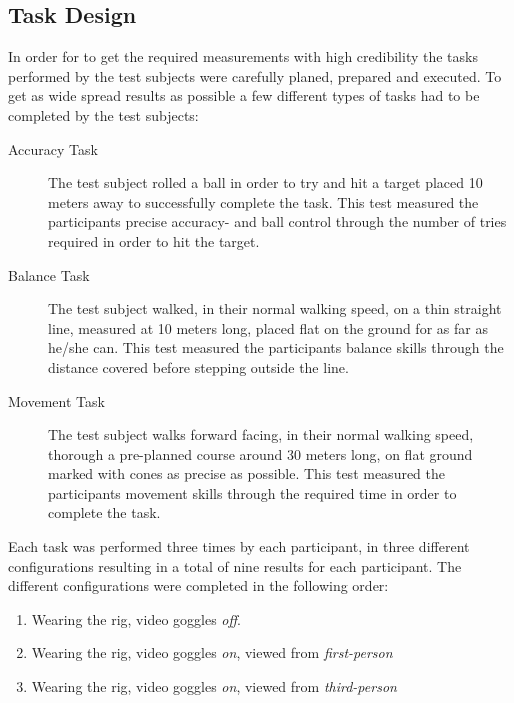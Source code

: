 \documentclass[runningheads,a4paper,oribibl]{llncs}
\begin{document}
\subsection{Task Design} \label{subsec:TaskDesign}

In order for to get the required measurements with high credibility the tasks performed by the test subjects were carefully planed, prepared and executed. To get as wide spread results as possible a few different types of tasks had to be completed by the test subjects:
\begin{description}
   \item[Accuracy Task] The test subject rolled a ball in order to try and hit a target placed 10 meters away to successfully complete the task. This test measured the participants precise accuracy- and ball control through the number of tries required in order to hit the target.
   \item[Balance Task] The test subject walked, in their normal walking speed, on a thin straight line, measured at 10 meters long, placed flat on the ground for as far as he/she can. This test measured the participants balance skills through the distance covered before stepping outside the line.
   \item[Movement Task] The test subject walks forward facing, in their normal walking speed, thorough a pre-planned course around 30 meters long, on flat ground marked with cones as precise as possible. This test measured the participants movement skills through the required time in order to complete the task.
\end{description}

Each task was performed three times by each participant, in three different configurations resulting in a total of nine results for each participant. The different configurations were completed in the following order:
\begin{enumerate}
	\item Wearing the rig, video goggles \emph{off}.
	\item Wearing the rig, video goggles \emph{on}, viewed from \emph{first-person}
	\item Wearing the rig, video goggles \emph{on}, viewed from \emph{third-person}
\end{enumerate}
\end{document}
